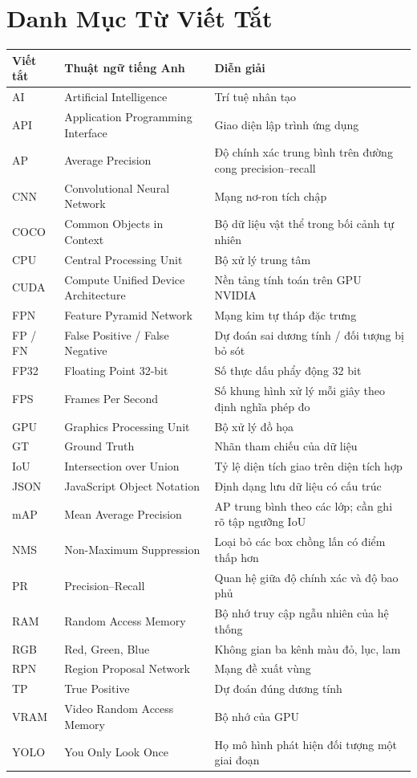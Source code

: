 \chapter*{Danh Mục Từ Viết Tắt}
\begingroup\small{}\renewcommand{\arraystretch}{1.1}
\begin{longtable}{p{2cm}p{5.2cm}p{7cm}}
\toprule Viết tắt & Thuật ngữ tiếng Anh & Diễn giải \\\midrule\endhead
AI & Artificial Intelligence & Trí tuệ nhân tạo \\
API & Application Programming Interface & Giao diện lập trình ứng dụng \\
AP & Average Precision & Độ chính xác trung bình trên đường cong precision--recall \\
CNN & Convolutional Neural Network & Mạng nơ-ron tích chập \\
COCO & Common Objects in Context & Bộ dữ liệu vật thể trong bối cảnh tự nhiên \\
CPU & Central Processing Unit & Bộ xử lý trung tâm \\
CUDA & Compute Unified Device Architecture & Nền tảng tính toán trên GPU NVIDIA \\
FPN & Feature Pyramid Network & Mạng kim tự tháp đặc trưng \\
FP / FN & False Positive / False Negative & Dự đoán sai dương tính / đối tượng bị bỏ sót \\
FP32 & Floating Point 32-bit & Số thực dấu phẩy động 32 bit \\
FPS & Frames Per Second & Số khung hình xử lý mỗi giây theo định nghĩa phép đo \\
GPU & Graphics Processing Unit & Bộ xử lý đồ họa \\
GT & Ground Truth & Nhãn tham chiếu của dữ liệu \\
IoU & Intersection over Union & Tỷ lệ diện tích giao trên diện tích hợp \\
JSON & JavaScript Object Notation & Định dạng lưu dữ liệu có cấu trúc \\
mAP & Mean Average Precision & AP trung bình theo các lớp; cần ghi rõ tập ngưỡng IoU \\
NMS & Non-Maximum Suppression & Loại bỏ các box chồng lấn có điểm thấp hơn \\
PR & Precision--Recall & Quan hệ giữa độ chính xác và độ bao phủ \\
RAM & Random Access Memory & Bộ nhớ truy cập ngẫu nhiên của hệ thống \\
RGB & Red, Green, Blue & Không gian ba kênh màu đỏ, lục, lam \\
RPN & Region Proposal Network & Mạng đề xuất vùng \\
TP & True Positive & Dự đoán đúng dương tính \\
VRAM & Video Random Access Memory & Bộ nhớ của GPU \\
YOLO & You Only Look Once & Họ mô hình phát hiện đối tượng một giai đoạn \\
\bottomrule
\end{longtable}
\endgroup
\clearpage

